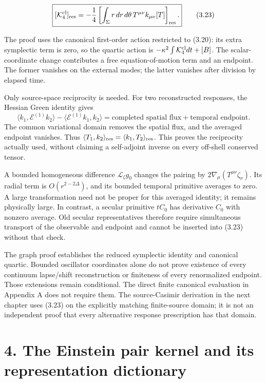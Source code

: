 \documentclass[a4paper,11pt]{article}
\numberwithin{equation}{section}
\begin{document}
\[
\boxed{
[\mathcal K_4^{\rm cl}]_{\rm res}
=-\frac14\left[
\int_\Sigma r\,dr\,d\theta\,
T^{\mu\nu}k_{\mu\nu}[T]\right]_{\rm res}.
}
\tag{3.23}
\]

The proof uses the canonical first-order action restricted to (3.20): its extra symplectic term is zero, so the quartic action is \(-\kappa^2\int\mathcal K_4^{\rm cl}dt+[B]\). The scalar-coordinate change contributes a free equation-of-motion term and an endpoint. The former vanishes on the external modes; the latter vanishes after division by elapsed time.

Only source-space reciprocity is needed. For two reconstructed responses, the Hessian Green identity gives \[
\langle k_1,\mathcal E^{(1)}k_2\rangle
-\langle\mathcal E^{(1)}k_1,k_2\rangle
=\text{completed spatial flux}+\text{temporal endpoint}.
\] The common variational domain removes the spatial flux, and the averaged endpoint vanishes. Thus \(\langle T_1,k_2\rangle_{\rm res} =\langle k_1,T_2\rangle_{\rm res}\). This proves the reciprocity actually used, without claiming a self-adjoint inverse on every off-shell conserved tensor.

A bounded homogeneous difference \(\mathcal L_\zeta g_0\) changes the pairing by \(2\nabla_\mu(T^{\mu\nu}\zeta_\nu)\). Its radial term is \(O(r^{2-2\Delta})\), and its bounded temporal primitive averages to zero. A large transformation need not be proper for this averaged identity; it remains physically large. In contrast, a secular primitive \(tC_0\) has derivative \(C_0\) with nonzero average. Old secular representatives therefore require simultaneous transport of the observable and endpoint and cannot be inserted into (3.23) without that check.

The graph proof establishes the reduced symplectic identity and canonical quartic. Bounded oscillator coordinates alone do not prove existence of every continuum lapse/shift reconstruction or finiteness of every renormalized endpoint. Those extensions remain conditional. The direct finite canonical evaluation in Appendix A does not require them. The source-Casimir derivation in the next chapter uses (3.23) on the explicitly matching finite-source domain; it is not an independent proof that every alternative response prescription has that domain.

\clearpage
\hypertarget{the-einstein-pair-kernel-and-its-representation-dictionary}{%
\section{4. The Einstein pair kernel and its representation dictionary}\label{the-einstein-pair-kernel-and-its-representation-dictionary}}
\end{document}

